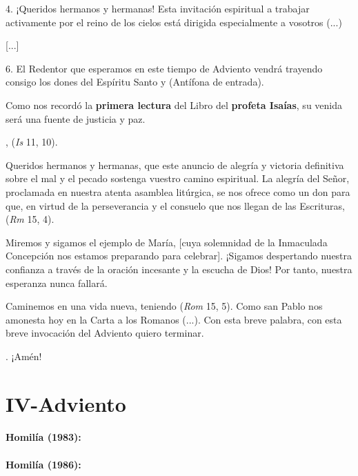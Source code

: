 \begin{body}
\begin{body}
		4. ¡Queridos hermanos y hermanas! Esta invitación espiritual a trabajar activamente por el reino de los cielos está dirigida especialmente a vosotros (...)
		
		{[}...{]}
		
		6. El Redentor que esperamos en este tiempo de Adviento vendrá trayendo consigo los dones del Espíritu Santo y  (Antífona de entrada).
		
		Como nos recordó la \textbf{primera lectura} del Libro del \textbf{profeta Isaías}, su venida será una fuente de justicia y paz.
		
		,  (\emph{Is} 11, 10).
		
		Queridos hermanos y hermanas, que este anuncio de alegría y victoria definitiva sobre el mal y el pecado sostenga vuestro camino espiritual. La alegría del Señor, proclamada en nuestra atenta asamblea litúrgica, se nos ofrece como un don para que, en virtud de la perseverancia y el consuelo que nos llegan de las Escrituras,  (\emph{Rm} 15, 4).
		
		Miremos y sigamos el ejemplo de María, {[}cuya solemnidad de la Inmaculada Concepción nos estamos preparando para celebrar{]}. ¡Sigamos despertando nuestra confianza a través de la oración incesante y la escucha de Dios! Por tanto, nuestra esperanza nunca fallará.
		
		Caminemos en una vida nueva, teniendo  (\emph{Rom} 15, 5). Como san Pablo nos amonesta hoy en la Carta a los Romanos (...). Con esta breve palabra, con esta breve invocación del Adviento quiero terminar.
		
		. ¡Amén!
	\end{body}
	
	\chapter{IV-Adviento}
	
	\subsubsection{Homilía (1983): }
	
	\subsubsection{Homilía (1986): }
	

\end{body}
